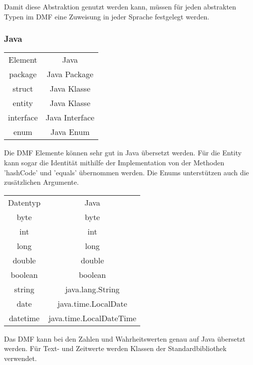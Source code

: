 \documentclass[./einleitung.tex]{subfiles}
\begin{document}
    Damit diese Abstraktion genutzt werden kann, müssen für jeden abstrakten Typen im DMF eine Zuweisung in jeder Sprache festgelegt werden.

    \subsubsection{Java}
    \begin{center}
        \begin{tabular}{| c || c |}
            \hline
            Element   & Java           \\
            \hhline{|=||=|}
            package   & Java Package   \\
            \hline
            struct    & Java Klasse    \\
            \hline
            entity    & Java Klasse    \\
            \hline
            interface & Java Interface \\
            \hline
            enum      & Java Enum      \\
            \hline
        \end{tabular}
    \end{center}
    Die DMF Elemente können sehr gut in Java übersetzt werden. Für die Entity kann sogar die Identität mithilfe der Implementation von der Methoden 'hashCode' und 'equals' übernommen werden. Die Enums unterstützen auch die zusätzlichen Argumente.

    \begin{center}
        \begin{tabular}{| c || c |}
            \hline
            Datentyp & Java                    \\
            \hhline{|=||=|}
            byte     & byte                    \\
            \hline
            int      & int                     \\
            \hline
            long     & long                    \\
            \hline
            double   & double                  \\
            \hline
            boolean  & boolean                 \\
            \hline
            string   & java.lang.String        \\
            \hline
            date     & java.time.LocalDate     \\
            \hline
            datetime & java.time.LocalDateTime \\
            \hline
        \end{tabular}
    \end{center}
    Das DMF kann bei den Zahlen und Wahrheitswerten genau auf Java übersetzt werden. Für Text- und Zeitwerte werden Klassen der Standardbibliothek verwendet.
\end{document}
